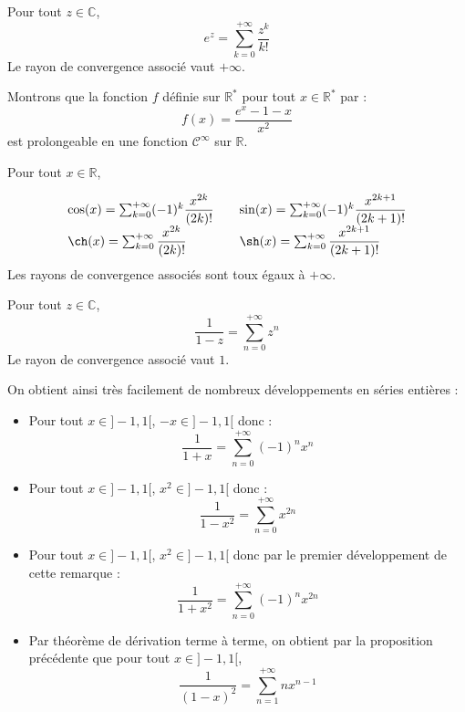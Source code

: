 \documentclass[french,11pt,twoside]{VcCours}
\begin{document}
\begin{Theoreme}{} Pour tout $z \in \mathbb{C}$,
$$ e^z = \sum_{k=0}^{+ \infty} \dfrac{z^k}{k!}$$
Le rayon de convergence associé vaut $+ \infty$.
\end{Theoreme}

\begin{Demonstration}{}
\vspace{11cm}
\end{Demonstration}

\begin{Exemple}{} Montrons que la fonction $f$ définie sur $\mathbb{R}^*$ pour tout $x \in \mathbb{R}^*$ par :
$$ f(x) = \frac{e^x-1-x}{x^2}$$
est prolongeable en une fonction $\mathcal{C}^{\infty}$ sur $\mathbb{R}$.

\vspace{5cm}
\end{Exemple}

\begin{Corollaire}{} Pour tout $x \in \mathbb{R}$,

$$ \begin{array}{ll}
\cos(x) = \sum_{k=0}^{+ \infty} (-1)^k \dfrac{x^{2k}}{(2k)!} & \quad  \sin(x) = \sum_{k=0}^{+ \infty} (-1)^k \dfrac{x^{2k+1}}{(2k+1)!}\\
\ch(x) = \sum_{k=0}^{+ \infty} \dfrac{x^{2k}}{(2k)!} & \quad  \sh(x) = \sum_{k=0}^{+ \infty}  \dfrac{x^{2k+1}}{(2k+1)!} \end{array}$$
Les rayons de convergence associés sont toux égaux à $+ \infty$.
\end{Corollaire}

\begin{Demonstration}{}
\vspace{6cm}
\end{Demonstration}

\begin{Proposition}{} Pour tout $z \in \mathbb{C}$,
$$ \dfrac{1}{1-z} = \sum_{n=0}^{+ \infty} z^n$$ 
Le rayon de convergence associé vaut $1$.
\end{Proposition}

\begin{Remarque}{} On obtient ainsi très facilement de nombreux développements en séries entières :

\begin{itemize}
\item Pour tout $x \in ]-1,1[$, $-x \in ]-1,1[$ donc :
$$ \dfrac{1}{1+x} = \sum_{n=0}^{+ \infty} (-1)^n x^n$$
\item Pour tout $x \in ]-1,1[$, $x^2 \in ]-1,1[$ donc :
$$ \dfrac{1}{1-x^2}=  \sum_{n=0}^{+ \infty} x^{2n}$$
\item Pour tout $x \in ]-1,1[$, $x^2 \in ]-1,1[$ donc par le premier développement de cette remarque :
$$ \dfrac{1}{1+x^2} = \sum_{n=0}^{+ \infty} (-1)^n x^{2n}$$
\item Par théorème de dérivation terme à terme, on obtient par la proposition précédente que pour tout $x \in ]-1,1[$,
$$ \dfrac{1}{(1-x)^2} = \sum_{n=1}^{+ \infty} n x^{n-1}$$
\end{itemize}
\end{Remarque}
\end{document}
